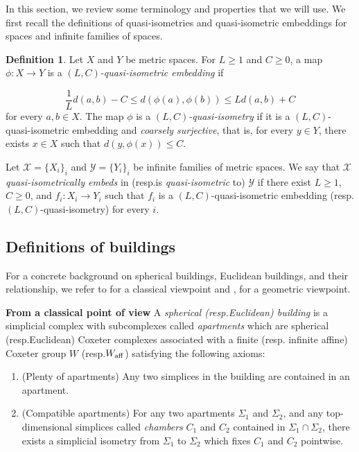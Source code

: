 \documentclass[letterpaper, reqno, 11pt]{amsart}
\theoremstyle{definition}
\newtheorem{definition}[theorem]{Definition}
\theoremstyle{definition}
\theoremstyle{remark}
\begin{document}
In this section, we review some terminology and properties that we will use. We first recall the definitions of quasi-isometries and quasi-isometric embeddings for spaces and infinite families of spaces.
\begin{definition} \label{def}
    Let $X$ and $Y$ be metric spaces. For $L\geq1$ and $C\geq 0$, a map $\phi: X \to Y$ is a \textit{$(L,C)$-quasi-isometric embedding} if 
    
    \begin{equation}\label{qi}
       \frac{1}{L}d(a,b)-C \leq d(\phi(a),\phi(b)) \leq Ld(a,b)+C 
    \end{equation}
    for every $a,b \in X$. 
    The map $\phi$ is a \textit{$(L,C)$-quasi-isometry} if it is a $(L,C)$-quasi-isometric embedding and \textit{coarsely surjective}, that is, for every $y \in Y$, there exists $x \in X$ such that $d(y,\phi(x))\leq C$. 

    Let $\mathscr{X}=\{X_i\}_i$ and $\mathscr{Y}=\{Y_i\}_i$ be infinite families of metric spaces. We say that $\mathscr{X}$ \textit{quasi-isometrically embeds} in (resp.\@ is \textit{quasi-isometric} to) $\mathscr{Y}$ if there exist $L \geq 1$, $C \geq 0$, and $f_i: X_i \to Y_i$ such that $f_i$ is a $(L,C)$-quasi-isometric embedding (resp.\@ $(L,C)$-quasi-isometry) for every $i$.
\end{definition}



\subsection{Definitions of buildings}
For a concrete background on spherical buildings, Euclidean buildings, and their relationship,
we refer to \cite{abramenko2008buildings} for a classical viewpoint and \cite{kleiner1997rigidity}, \cite{MR1744486} for a geometric viewpoint. 

\medskip
\textbf{From a classical point of view} 
A \textit{ spherical (resp.\@ Euclidean) building} is a simplicial complex with subcomplexes called \textit{apartments} which are spherical (resp.\@ Euclidean) Coxeter complexes associated with a finite (resp. infinite affine) Coxeter group $W$ (resp.\@ $W_{\rm{aff}}$) satisfying the following axioms:


\begin{enumerate}
        \item (Plenty of apartments) Any two simplices in the building are contained in an apartment.
        \item (Compatible apartments) For any two apartments $\Sigma_1$ and $\Sigma_2$, and any top-dimensional simplices called \textit{chambers}
        $C_1$ and $C_2$ contained in $\Sigma_1 \cap \Sigma_2$, there exists a simplicial isometry from $\Sigma_1$ to $\Sigma_2$ which fixes $C_1$ and $C_2$ pointwise. 
     \end{enumerate}   
\end{document}
